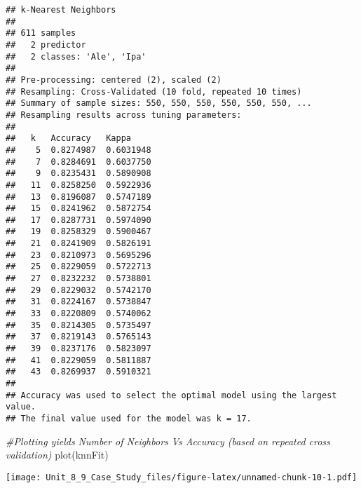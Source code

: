 \documentclass[
]{article}
\newenvironment{Shaded}{\begin{snugshade}}{\end{snugshade}}
\newcommand{\AttributeTok}[1]{\textcolor[rgb]{0.77,0.63,0.00}{#1}}
\newcommand{\CommentTok}[1]{\textcolor[rgb]{0.56,0.35,0.01}{\textit{#1}}}
\newcommand{\FunctionTok}[1]{\textcolor[rgb]{0.00,0.00,0.00}{#1}}
\newcommand{\NormalTok}[1]{#1}
\newcommand{\OtherTok}[1]{\textcolor[rgb]{0.56,0.35,0.01}{#1}}
\newcommand{\SpecialCharTok}[1]{\textcolor[rgb]{0.00,0.00,0.00}{#1}}
\begin{document}
\begin{verbatim}
## k-Nearest Neighbors 
## 
## 611 samples
##   2 predictor
##   2 classes: 'Ale', 'Ipa' 
## 
## Pre-processing: centered (2), scaled (2) 
## Resampling: Cross-Validated (10 fold, repeated 10 times) 
## Summary of sample sizes: 550, 550, 550, 550, 550, 550, ... 
## Resampling results across tuning parameters:
## 
##   k   Accuracy   Kappa    
##    5  0.8274987  0.6031948
##    7  0.8284691  0.6037750
##    9  0.8235431  0.5890908
##   11  0.8258250  0.5922936
##   13  0.8196087  0.5747189
##   15  0.8241962  0.5872754
##   17  0.8287731  0.5974090
##   19  0.8258329  0.5900467
##   21  0.8241909  0.5826191
##   23  0.8210973  0.5695296
##   25  0.8229059  0.5722713
##   27  0.8232232  0.5738801
##   29  0.8229032  0.5742170
##   31  0.8224167  0.5738847
##   33  0.8220809  0.5740062
##   35  0.8214305  0.5735497
##   37  0.8219143  0.5765143
##   39  0.8237176  0.5823097
##   41  0.8229059  0.5811887
##   43  0.8269937  0.5910321
## 
## Accuracy was used to select the optimal model using the largest value.
## The final value used for the model was k = 17.
\end{verbatim}

\begin{Shaded}
\begin{Highlighting}[]
\CommentTok{\#Plotting yields Number of Neighbors Vs Accuracy (based on repeated cross validation)}
\FunctionTok{plot}\NormalTok{(knnFit)}
\end{Highlighting}
\end{Shaded}

\texttt{[image: Unit\_8\_9\_Case\_Study\_files/figure-latex/unnamed-chunk-10-1.pdf]}

\begin{Shaded}
\end{Shaded}
\end{document}
